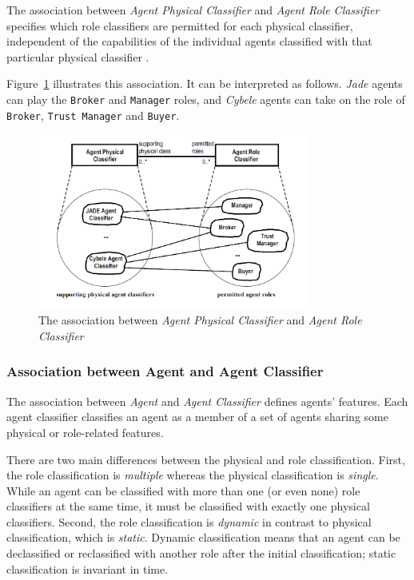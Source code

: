 The association between \textit{Agent Physical Classifier} and \textit{Agent Role Classifier} specifies which role classifiers are permitted for each physical classifier, independent of the capabilities of the individual agents classified with that particular physical classifier \cite{Odell05}.

Figure~\ref{figure:onp-physical-classifier-role-classifier-association} illustrates this association.
It can be interpreted as follows. \textit{Jade} agents can play the \texttt{Broker} and \texttt{Manager} roles, and \textit{Cybele} agents can take on the role of \texttt{Broker}, \texttt{Trust Manager} and \texttt{Buyer}.

\begin{figure}[ht]
	\centering
	\includegraphics[width=0.8\textwidth]{images/onp/physical-classifier-role-classifier-association.png}
	\caption{The association between \textit{Agent Physical Classifier} and \textit{Agent Role Classifier} \cite{Odell05}}
	\label{figure:onp-physical-classifier-role-classifier-association}
\end{figure}

\subsubsection*{Association between Agent and Agent Classifier}

The association between \textit{Agent} and \textit{Agent Classifier} defines agents' features.
Each agent classifier classifies an agent as a member of a set of agents sharing some physical or role-related features.

There are two main differences between the physical and role classification. First, the role classification is \textit{multiple} whereas the physical classification is \textit{single}.
While an agent can be classified with more than one (or even none) role classifiers at the same time, it must be classified with exactly one physical classifiers.
Second, the role classification is \textit{dynamic} in contrast to physical classification, which is \textit{static}.
Dynamic classification means that an agent can be declassified or reclassified with another role after the initial classification; static classification is invariant in time.

